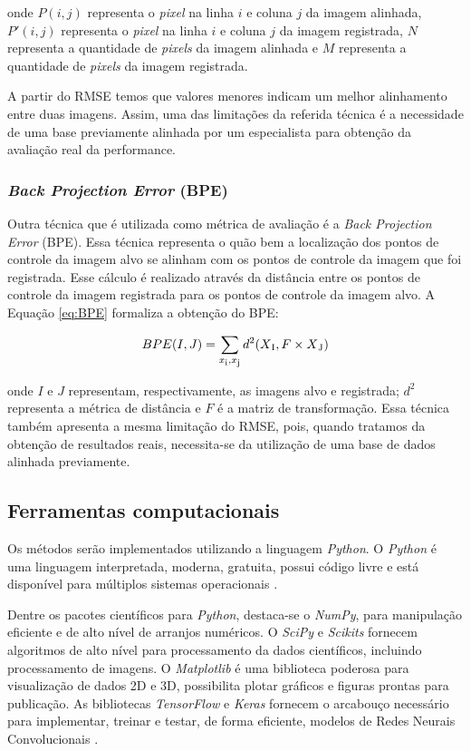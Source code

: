 \documentclass[12pt]{article}
\begin{document}
\noindent onde $P(i,j)$ representa o \textit{pixel} na linha $i$ e coluna $j$ da imagem alinhada, $P'(i,j)$ representa o \textit{pixel} na linha $i$ e coluna $j$ da imagem registrada, $N$ representa a quantidade de \textit{pixels} da imagem alinhada e $M$ representa a quantidade de \textit{pixels} da imagem registrada. 

A partir do RMSE temos que valores menores indicam um melhor alinhamento entre duas imagens. Assim, uma das limitações da referida técnica é a necessidade de uma base previamente alinhada por um especialista para obtenção da avaliação real da performance.


\subsubsection{\textit{Back Projection Error} (BPE)}

Outra técnica que é utilizada como métrica de avaliação é a \textit{Back Projection Error} (BPE). Essa técnica representa o quão bem a localização dos pontos de controle da imagem alvo se alinham com os pontos de controle da imagem que foi registrada. Esse cálculo é realizado através da distância entre os pontos de controle da imagem registrada para os pontos de controle da imagem alvo. A Equação \ref{eq:BPE} formaliza a obtenção do BPE:

\begin{equation}\label{eq:BPE}
    BPE(I, J) = {\sum_{x\textsubscript{i},x\textsubscript{j}}d^2(X\textsubscript{I}, F\times{}X\textsubscript{J})}
\end{equation}

\noindent onde $I$ e $J$ representam, respectivamente, as imagens alvo e registrada; $d^2$ representa a métrica de distância e $F$ é a matriz de transformação. Essa técnica também apresenta a mesma limitação do RMSE, pois, quando tratamos da obtenção de resultados reais, necessita-se da utilização de uma base de dados alinhada previamente.


\subsection{Ferramentas computacionais}

Os métodos serão implementados utilizando a linguagem \textit{Python}. O \textit{Python} é uma linguagem interpretada, moderna, gratuita, possui código livre e está disponível para múltiplos sistemas operacionais \cite{perez2010python}. 

Dentre os pacotes científicos para \textit{Python}, destaca-se o \textit{NumPy}, para manipulação eficiente e de alto nível de arranjos numéricos. O \textit{SciPy} e \textit{Scikits} fornecem algoritmos de alto nível para processamento da dados científicos, incluindo processamento de imagens. O \textit{Matplotlib} é uma biblioteca poderosa para visualização de dados 2D e 3D, possibilita plotar gráficos e figuras prontas para publicação. As bibliotecas \textit{TensorFlow} e \textit{Keras} fornecem o arcabouço necessário para implementar, treinar e testar, de forma eficiente, modelos de Redes Neurais Convolucionais \cite{abadi2016tensorflow}.
\end{document}
